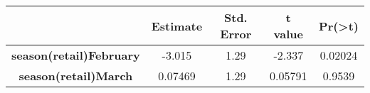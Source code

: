 \documentclass[]{book}
\theoremstyle{definition}
\theoremstyle{definition}
\theoremstyle{remark}
\begin{document}
\begin{longtable}[c]{@{}ccccc@{}}
\toprule
\begin{minipage}[b]{0.35\columnwidth}\centering\strut
~
\strut\end{minipage} &
\begin{minipage}[b]{0.13\columnwidth}\centering\strut
Estimate
\strut\end{minipage} &
\begin{minipage}[b]{0.15\columnwidth}\centering\strut
Std. Error
\strut\end{minipage} &
\begin{minipage}[b]{0.12\columnwidth}\centering\strut
t value
\strut\end{minipage} &
\begin{minipage}[b]{0.12\columnwidth}\centering\strut
Pr(\textgreater{}\textbar{}t\textbar{})
\strut\end{minipage}\tabularnewline
\midrule
\endhead
\begin{minipage}[t]{0.35\columnwidth}\centering\strut
\textbf{season(retail)February}
\strut\end{minipage} &
\begin{minipage}[t]{0.13\columnwidth}\centering\strut
-3.015
\strut\end{minipage} &
\begin{minipage}[t]{0.15\columnwidth}\centering\strut
1.29
\strut\end{minipage} &
\begin{minipage}[t]{0.12\columnwidth}\centering\strut
-2.337
\strut\end{minipage} &
\begin{minipage}[t]{0.12\columnwidth}\centering\strut
0.02024
\strut\end{minipage}\tabularnewline
\begin{minipage}[t]{0.35\columnwidth}\centering\strut
\textbf{season(retail)March}
\strut\end{minipage} &
\begin{minipage}[t]{0.13\columnwidth}\centering\strut
0.07469
\strut\end{minipage} &
\begin{minipage}[t]{0.15\columnwidth}\centering\strut
1.29
\strut\end{minipage} &
\begin{minipage}[t]{0.12\columnwidth}\centering\strut
0.05791
\strut\end{minipage} &
\begin{minipage}[t]{0.12\columnwidth}\centering\strut
0.9539

\end{minipage}
\end{longtable}
\end{document}
